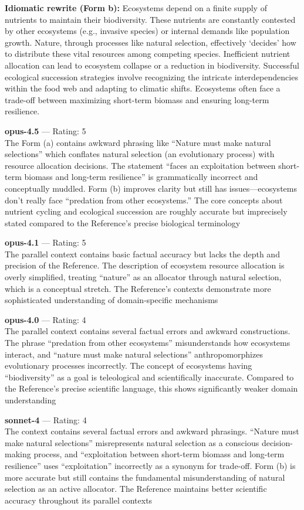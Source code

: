 \textbf{Idiomatic rewrite (Form b):} Ecosystems depend on a finite supply of nutrients to maintain their biodiversity. These nutrients are constantly contested by other ecosystems (e.g., invasive species) or internal demands like population growth. Nature, through processes like natural selection, effectively `decides' how to distribute these vital resources among competing species. Inefficient nutrient allocation can lead to ecosystem collapse or a reduction in biodiversity. Successful ecological succession strategies involve recognizing the intricate interdependencies within the food web and adapting to climatic shifts. Ecosystems often face a trade-off between maximizing short-term biomass and ensuring long-term resilience.

\textbf{opus-4.5} --- Rating: 5\\
The Form (a) contains awkward phrasing like ``Nature must make natural selections'' which conflates natural selection (an evolutionary process) with resource allocation decisions. The statement ``faces an exploitation between short-term biomass and long-term resilience'' is grammatically incorrect and conceptually muddled. Form (b) improves clarity but still has issues---ecosystems don't really face ``predation from other ecosystems.'' The core concepts about nutrient cycling and ecological succession are roughly accurate but imprecisely stated compared to the Reference's precise biological terminology

\textbf{opus-4.1} --- Rating: 5\\
The parallel context contains basic factual accuracy but lacks the depth and precision of the Reference. The description of ecosystem resource allocation is overly simplified, treating ``nature'' as an allocator through natural selection, which is a conceptual stretch. The Reference's contexts demonstrate more sophisticated understanding of domain-specific mechanisms

\textbf{opus-4.0} --- Rating: 4\\
The parallel context contains several factual errors and awkward constructions. The phrase ``predation from other ecosystems'' misunderstands how ecosystems interact, and ``nature must make natural selections'' anthropomorphizes evolutionary processes incorrectly. The concept of ecosystems having ``biodiversity'' as a goal is teleological and scientifically inaccurate. Compared to the Reference's precise scientific language, this shows significantly weaker domain understanding

\textbf{sonnet-4} --- Rating: 4\\
The context contains several factual errors and awkward phrasings. ``Nature must make natural selections'' misrepresents natural selection as a conscious decision-making process, and ``exploitation between short-term biomass and long-term resilience'' uses ``exploitation'' incorrectly as a synonym for trade-off. Form (b) is more accurate but still contains the fundamental misunderstanding of natural selection as an active allocator. The Reference maintains better scientific accuracy throughout its parallel contexts

